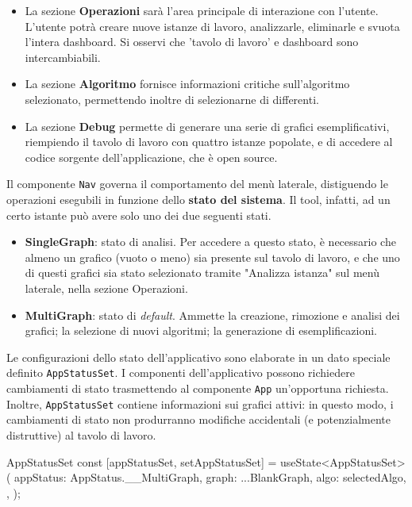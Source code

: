 \begin{itemize}
    \item La sezione \textbf{Operazioni} sarà l'area principale di interazione con l'utente. L'utente potrà creare nuove istanze di lavoro, analizzarle, eliminarle e svuota l'intera dashboard. Si osservi che 'tavolo di lavoro' e dashboard sono intercambiabili.
    \item La sezione \textbf{Algoritmo} fornisce informazioni critiche sull'algoritmo selezionato, permettendo inoltre di selezionarne di differenti. 
    \item La sezione \textbf{Debug} permette di generare una serie di grafici esemplificativi, riempiendo il tavolo di lavoro con quattro istanze popolate, e di accedere al codice sorgente dell'applicazione, che è open source.
\end{itemize}

Il componente \verb|Nav| governa il comportamento del menù laterale, distiguendo le operazioni esegubili in funzione dello \textbf{stato del sistema}. Il tool, infatti, ad un certo istante può avere solo uno dei due seguenti stati.
\begin{itemize}
    \item \textbf{SingleGraph}: stato di analisi. Per accedere a questo stato, è necessario che almeno un grafico (vuoto o meno) sia presente sul tavolo di lavoro, e che uno di questi grafici sia stato selezionato tramite "Analizza istanza" sul menù laterale, nella sezione Operazioni.
    \item \textbf{MultiGraph}: stato di \textit{default}. Ammette la creazione, rimozione e analisi dei grafici; la selezione di nuovi algoritmi; la generazione di esemplificazioni.
\end{itemize}

Le configurazioni dello stato dell'applicativo sono elaborate in un dato speciale definito \verb|AppStatusSet|. I componenti dell'applicativo possono richiedere cambiamenti di stato trasmettendo al componente \verb|App| un'opportuna richiesta. Inoltre, \verb|AppStatusSet| contiene informazioni sui grafici attivi: in questo modo, i cambiamenti di stato non produrranno modifiche accidentali (e potenzialmente distruttive) al tavolo di lavoro.

\begin{sexylisting}{AppStatusSet}
const [appStatusSet, setAppStatusSet] = 
  useState<AppStatusSet>({
    appStatus: AppStatus.__MultiGraph,
    graph: {
      ...BlankGraph,
	  algo: selectedAlgo,
    },
  });
\end{sexylisting}

